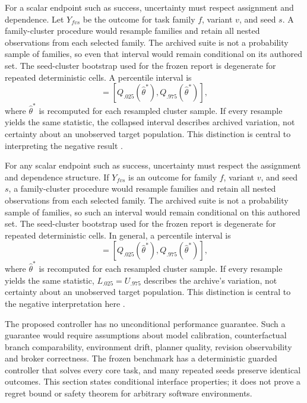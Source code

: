 \documentclass[11pt]{article}
\begin{document}
For a scalar endpoint such as success, uncertainty must respect assignment and dependence. Let $Y_{fvs}$ be the outcome for task family $f$, variant $v$, and seed $s$. A family-cluster procedure would resample families and retain all nested observations from each selected family. The archived suite is not a probability sample of families, so even that interval would remain conditional on its authored set. The seed-cluster bootstrap used for the frozen report is degenerate for repeated deterministic cells. A percentile interval is
\begin{equation}
[L_{.025},U_{.975}]=[Q_{.025}(\widehat{\theta}^{*}),Q_{.975}(\widehat{\theta}^{*})],
\end{equation}
where $\widehat{\theta}^{*}$ is recomputed for each resampled cluster sample. If every resample yields the same statistic, the collapsed interval describes archived variation, not certainty about an unobserved target population. This distinction is central to interpreting the negative result \cite{efron1993,demsar2006,nadeau2003}.

For any scalar endpoint such as success, uncertainty must respect the assignment and dependence structure. If $Y_{fvs}$ is an outcome for family $f$, variant $v$, and seed $s$, a family-cluster procedure would resample families and retain all nested observations from each selected family. The archived suite is not a probability sample of families, so such an interval would remain conditional on this authored set. The seed-cluster bootstrap used for the frozen report is degenerate for repeated deterministic cells. In general, a percentile interval is
\begin{equation}
[L_{.025},U_{.975}]=[Q_{.025}(\widehat{\theta}^{*}),Q_{.975}(\widehat{\theta}^{*})],
\end{equation}
where $\widehat{\theta}^{*}$ is recomputed for each resampled cluster sample. If every resample yields the same statistic, $L_{.025}=U_{.975}$ describes the archive's variation, not certainty about an unobserved target population. This distinction is central to the negative interpretation here \cite{efron1993,demsar2006,nadeau2003}.

The proposed controller has no unconditional performance guarantee. Such a guarantee would require assumptions about model calibration, counterfactual branch comparability, environment drift, planner quality, revision observability and broker correctness. The frozen benchmark has a deterministic guarded controller that solves every core task, and many repeated seeds preserve identical outcomes. This section states conditional interface properties; it does not prove a regret bound or safety theorem for arbitrary software environments.
\end{document}
